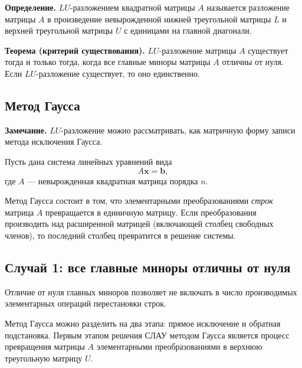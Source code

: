 \documentclass[11pt,a4paper]{article}
\begin{document}
\textbf{Определение.} \(LU\)-разложением квадратной матрицы \(A\)
называется разложение матрицы \(A\) в произведение невырожденной нижней
треугольной матрицы \(L\) и верхней треугольной матрицы \(U\) с
единицами на главной диагонали.

\textbf{Теорема (критерий существования).} \(LU\)-разложение матрицы
\(A\) существует тогда и только тогда, когда все главные миноры матрицы
\(A\) отличны от нуля. Если \(LU\)-разложение существует, то оно
единственно.

    \hypertarget{ux43cux435ux442ux43eux434-ux433ux430ux443ux441ux441ux430}{%
\subsection{Метод
Гаусса}\label{ux43cux435ux442ux43eux434-ux433ux430ux443ux441ux441ux430}}

\textbf{Замечание.} \(LU\)-разложение можно рассматривать, как матричную
форму записи метода исключения Гаусса.

Пусть дана система линейных уравнений вида
\[ A \mathbf{x} = \mathbf{b}, \] где \(A\) --- невырожденная квадратная
матрица порядка \(n\).

Метод Гаусса состоит в том, что элементарными преобразованиями
\emph{строк} матрица \(A\) превращается в единичную матрицу. Если
преобразования производить над расширенной матрицей (включающей столбец
свободных членов), то последний столбец превратится в решение системы.

    \hypertarget{ux441ux43bux443ux447ux430ux439-1-ux432ux441ux435-ux433ux43bux430ux432ux43dux44bux435-ux43cux438ux43dux43eux440ux44b-ux43eux442ux43bux438ux447ux43dux44b-ux43eux442-ux43dux443ux43bux44f}{%
\subsection{Случай 1: все главные миноры отличны от
нуля}\label{ux441ux43bux443ux447ux430ux439-1-ux432ux441ux435-ux433ux43bux430ux432ux43dux44bux435-ux43cux438ux43dux43eux440ux44b-ux43eux442ux43bux438ux447ux43dux44b-ux43eux442-ux43dux443ux43bux44f}}

Отличие от нуля главных миноров позволяет не включать в число
производимых элементарных операций перестановки строк.

Метод Гаусса можно разделить на два этапа: прямое исключение и обратная
подстановка. Первым этапом решения СЛАУ методом Гаусса является процесс
превращения матрицы \(A\) элементарными преобразованиями в верхнюю
треугольную матрицу \(U\).
\end{document}
